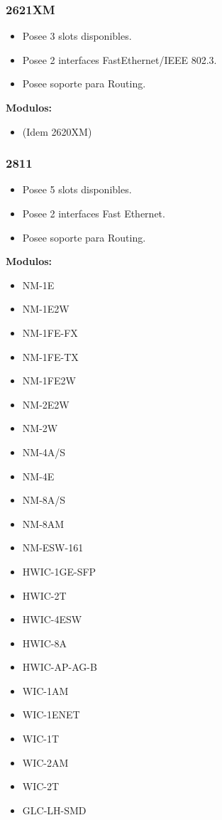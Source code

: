 \documentclass{article}
\begin{document}
\subsubsection{2621XM}
\begin{itemize}
    \item Posee 3 slots disponibles.
    \item Posee 2 interfaces FastEthernet/IEEE 802.3.
    \item Posee soporte para Routing.
\end{itemize}
\textbf{Modulos:}
\begin{itemize}
    \item (Idem 2620XM)
\end{itemize}

\subsubsection{2811}
\begin{itemize}
    \item Posee 5 slots disponibles.
    \item Posee 2 interfaces Fast Ethernet.
    \item Posee soporte para Routing.
\end{itemize}
\textbf{Modulos:}
\begin{itemize}
    \item NM-1E
    \item NM-1E2W
    \item NM-1FE-FX
    \item NM-1FE-TX
    \item NM-1FE2W
    \item NM-2E2W
    \item NM-2W
    \item NM-4A/S
    \item NM-4E
    \item NM-8A/S
    \item NM-8AM
    \item NM-ESW-161
    \item HWIC-1GE-SFP
    \item HWIC-2T
    \item HWIC-4ESW
    \item HWIC-8A
    \item HWIC-AP-AG-B
    \item WIC-1AM
    \item WIC-1ENET
    \item WIC-1T
    \item WIC-2AM
    \item WIC-2T
    \item GLC-LH-SMD
\end{itemize}
\end{document}
